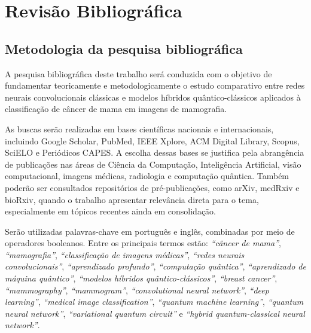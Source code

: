 \documentclass[
    12pt,
    openright,
    oneside,
    a4paper,
    english,
    brazil
]{abntex2}
\begin{document}
\chapter{Revisão Bibliográfica}

\section{Metodologia da pesquisa bibliográfica}

A pesquisa bibliográfica deste trabalho será conduzida com o objetivo de fundamentar teoricamente e metodologicamente o estudo comparativo entre redes neurais convolucionais clássicas e modelos híbridos quântico-clássicos aplicados à classificação de câncer de mama em imagens de mamografia.

As buscas serão realizadas em bases científicas nacionais e internacionais, incluindo Google Scholar, PubMed, IEEE Xplore, ACM Digital Library, Scopus, SciELO e Periódicos CAPES. A escolha dessas bases se justifica pela abrangência de publicações nas áreas de Ciência da Computação, Inteligência Artificial, visão computacional, imagens médicas, radiologia e computação quântica. Também poderão ser consultados repositórios de pré-publicações, como arXiv, medRxiv e bioRxiv, quando o trabalho apresentar relevância direta para o tema, especialmente em tópicos recentes ainda em consolidação.

Serão utilizadas palavras-chave em português e inglês, combinadas por meio de operadores booleanos. Entre os principais termos estão: \textit{``câncer de mama''}, \textit{``mamografia''}, \textit{``classificação de imagens médicas''}, \textit{``redes neurais convolucionais''}, \textit{``aprendizado profundo''}, \textit{``computação quântica''}, \textit{``aprendizado de máquina quântico''}, \textit{``modelos híbridos quântico-clássicos''}, \textit{``breast cancer''}, \textit{``mammography''}, \textit{``mammogram''}, \textit{``convolutional neural network''}, \textit{``deep learning''}, \textit{``medical image classification''}, \textit{``quantum machine learning''}, \textit{``quantum neural network''}, \textit{``variational quantum circuit''} e \textit{``hybrid quantum-classical neural network''}.
\end{document}
